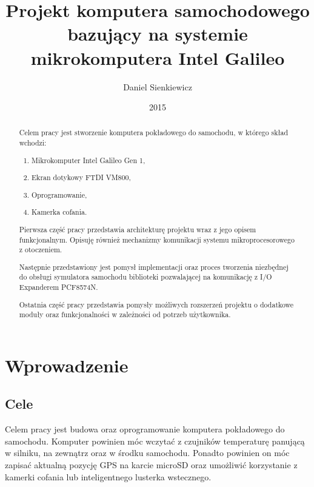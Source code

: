 \documentclass{xmgr}
\author   {Daniel Sienkiewicz}
\title    {Projekt komputera samochodowego bazujący na systemie mikrokomputera Intel Galileo}
\date     {2015}
\begin{document}
\begin{abstract}
Celem pracy jest stworzenie komputera pokładowego do samochodu, w którego skład wchodzi: \begin{enumerate}
\item Mikrokomputer Intel Galileo Gen 1, 
\item Ekran dotykowy FTDI VM800, 
\item Oprogramowanie,
\item Kamerka cofania.
\end{enumerate}

Pierwsza część pracy przedstawia architekturę projektu wraz z jego opisem funkcjonalnym. Opisuję również mechanizmy komunikacji systemu mikroprocesorowego z otoczeniem.

Następnie przedstawiony jest pomysł implementacji oraz proces tworzenia niezbędnej do obsługi symulatora samochodu biblioteki pozwalającej na komunikację z I/O Expanderem PCF8574N.

Ostatnia część pracy przedstawia pomysły  możliwych rozszerzeń projektu o dodatkowe moduły oraz funkcjonalności w zależności od potrzeb użytkownika.
\end{abstract}
\maketitle

\chapter{Wprowadzenie}
\section{Cele}
Celem pracy jest budowa oraz oprogramowanie komputera pokładowego do samochodu. Komputer powinien móc wczytać z czujników temperaturę panującą w silniku, na zewnątrz oraz w środku samochodu. Ponadto powinien on móc zapisać aktualną pozycję GPS na karcie microSD oraz umożliwić korzystanie z kamerki cofania lub inteligentnego lusterka wstecznego.
\end{document}
